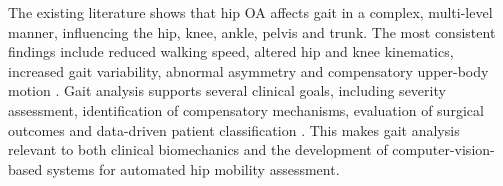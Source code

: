 \documentclass[12pt]{elsarticle}
\begin{document}
The existing literature shows that hip OA affects gait in a { complex,} multi-level manner, influencing the { hip, knee, ankle, pelvis and trunk. The} most consistent findings include reduced walking speed, altered hip and knee kinematics, increased gait variability, abnormal { asymmetry} and compensatory upper-body motion \cite{kiss2010effect,ismailidis2021kinematic,reininga2012subjects,eitzen2012sagittal,meyer2015biomechanical}. { Gait analysis supports} several clinical goals, including severity assessment, identification of compensatory mechanisms, evaluation of surgical { outcomes and data-driven patient} classification \cite{laroche2014classification,meyer2015biomechanical,mont2007gait}. This makes gait analysis relevant { to both clinical biomechanics and} the development of computer-vision-based systems for automated hip mobility assessment.
\end{document}
